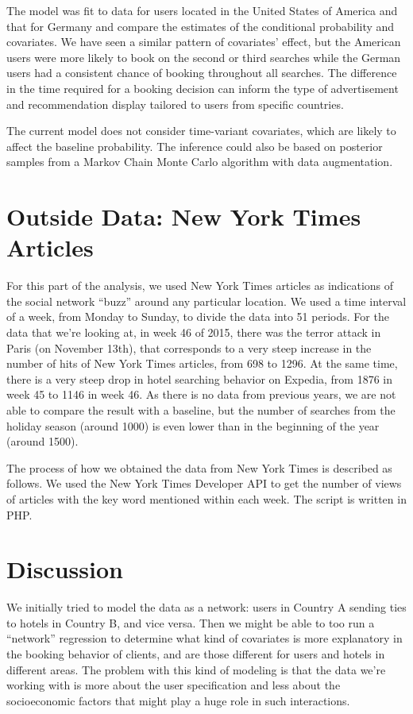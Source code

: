 \documentclass[a4paper]{article}
\begin{document}
The model was fit to data for users located in the United States of America and that for Germany and compare the estimates of the conditional probability and covariates. We have seen a similar pattern of covariates' effect, but the American users were more likely to book on the second or third searches while the German users had a consistent chance of booking throughout all searches. The difference in the time required for a booking decision can inform the type of advertisement and recommendation display tailored to users from specific countries.

The current model does not consider time-variant covariates, which are likely to affect the baseline probability. The inference could also be based on posterior samples from a Markov Chain Monte Carlo algorithm with data augmentation.

\section{Outside Data: New York Times Articles}
For this part of the analysis, we used New York Times articles as indications of the social network ``buzz'' around any particular location. We used a time interval of a week, from Monday to Sunday, to divide the data into 51 periods. For the data that we're looking at, in week 46 of 2015, there was the terror attack in Paris (on November 13th), that corresponds to a very steep increase in the number of hits of New York Times articles, from 698 to 1296. At the same time, there is a very steep drop in hotel searching behavior on Expedia, from 1876 in week 45 to 1146 in week 46. As there is no data from previous years, we are not able to compare the result with a baseline, but the number of searches from the holiday season (around 1000) is even lower than in the beginning of the year (around 1500).

The process of how we obtained the data from New York Times is described as follows. We used the New York Times Developer API to get the number of views of articles with the key word mentioned within each week. The script is written in PHP.

\section{Discussion}
We initially tried to model the data as a network: users in Country A sending ties to hotels in Country B, and vice versa. Then we might be able to too run a ``network'' regression to determine what kind of covariates is more explanatory in the booking behavior of clients, and are those different for users and hotels in different areas.  The problem with this kind of modeling is that the data we're working with is more about the user specification and less about the socioeconomic factors that might play a huge role in such interactions.
\end{document}
